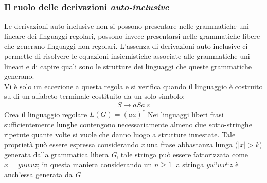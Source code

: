\subsubsection{Il ruolo delle derivazioni \emph{auto-inclusive}}
Le derivazioni auto-inclusive non si possono presentare nelle grammatiche uni-lineare dei linguaggi regolari, possono invece presentarsi nelle grammatiche libere che generano linguaggi non regolari. L'assenza di derivazioni auto inclusive ci permette di risolvere le equazioni insiemistiche associate alle grammatiche uni-lineari e di capire quali sono le strutture dei linguaggi che queste grammatiche generano. \\
Vi è solo un eccezione a questa regola e si verifica quando il linguaggio è costruito su di un alfabeto terminale costituito da un solo simbolo:
$$S\rightarrow aSa | \varepsilon$$
Crea il linguaggio regolare $L(G) = (aa)^* $
Nei linguaggi liberi frasi sufficientemente lunghe contengono necessariamente almeno due sotto-stringhe ripetute quante volte si vuole che danno luogo a strutture innestate.
Tale proprietà può essere espressa considerando \emph{x} una frase abbastanza lunga ($ |x| > k $) generata dalla grammatica libera \emph{G}, tale stringa può essere fattorizzata come $ x = yuwvz $; in questa maniera considerando un $ n\geq 1 $ la stringa $ yu^nwv^nz $ è anch'essa generata da \emph{G}
